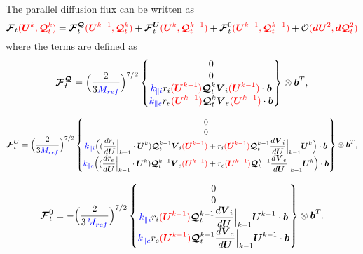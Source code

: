 \documentclass[a4paper,10pt]{article}
\newcommand{\bm}[1]{\text{\boldmath$#1$\unboldmath}}
\renewcommand{\b}{\bm{b}}
\newcommand{\DiscFunc}[1]{\bm{#1}}
\newcommand{\SecOrdTens}[1]{\bm{\mathcal{#1}}}
\renewcommand{\u}{\DiscFunc{U}}
\newcommand{\F}{\SecOrdTens{F}}
\newcommand{\G}{\SecOrdTens{Q}}
\newcommand{\Gt}{\G_t}
\newcommand{\nd}[1]{{\color{blue} #1\color{black}}} %
\newcommand{\fo}[1]{{ \color{red} ( #1 )\color{black} }} %
\def\Mref{\nd{M_{ref}}}
\def\kpai{\nd{k_{\parallel i}}}
\def\kpae{\nd{k_{\parallel e}}}
\begin{document}
The parallel diffusion flux can be written as
\[
\F_t\fo{\u^k,\Gt^k} = \F_t^{\G}\fo{\u^{k-1},\Gt^k}+\F_t^{\u}\fo{\u^k,\Gt^{k-1}}+\F_t^0\fo{\u^{k-1},\Gt^{k-1}} +  \mathcal{O}\fo{\bm{dU}^2,\bm{d}\Gt^2}
\]
where the terms are defined as
\begin{equation*}
 \F_t^\G = \Big(\dfrac{2}{3 \Mref }\Big)^{7/2} \begin{Bmatrix}
                     0 \\
                     0 \\
                     \kpai  r_i\fo{\u^{k-1}}\Gt^k \bm{V}_i\fo{\u^{k-1}} \cdot \b\\
                     \kpae  r_e\fo{\u^{k-1}}\Gt^k \bm{V}_e\fo{\u^{k-1}} \cdot \b
       \end{Bmatrix}\otimes \b^T,
\end{equation*}

\begin{equation*}
 \F_t^\u = \Big(\dfrac{2}{3 \Mref }\Big)^{7/2} \begin{Bmatrix}
                     0 \\
                     0 \\
                     \kpai \Big( (\dfrac{dr_i}{d\u}\Big|_{k-1}\cdot \u^k)\Gt^{k-1}\bm{V}_i\fo{\u^{k-1}}+ r_i\fo{\u^{k-1}}\Gt^{k-1}\dfrac{d\bm{V}_i}{d\u}\Big|_{k-1}\u^k   \Big)    \cdot \b\\
                     \kpae \Big( (\dfrac{dr_e}{d\u}\Big|_{k-1}\cdot \u^k)\Gt^{k-1}\bm{V}_e\fo{\u^{k-1}}+ r_e\fo{\u^{k-1}}\Gt^{k-1}\dfrac{d\bm{V}_e}{d\u}\Big|_{k-1}\u^k   \Big)    \cdot \b
       \end{Bmatrix}\otimes \b^T,
\end{equation*}

\begin{equation*}
 \F_t^0 = -\Big(\dfrac{2}{3 \Mref }\Big)^{7/2} \begin{Bmatrix}
                     0 \\
                     0 \\
                     \kpai  r_i\fo{\u^{k-1}}\Gt^{k-1}\dfrac{d\bm{V}_i}{d\u}\Big|_{k-1}\u^{k-1} \cdot \b\\
                     \kpae  r_e\fo{\u^{k-1}}\Gt^{k-1}\dfrac{d\bm{V}_e}{d\u}\Big|_{k-1}\u^{k-1} \cdot \b
       \end{Bmatrix}\otimes \b^T.
\end{equation*}
\end{document}
